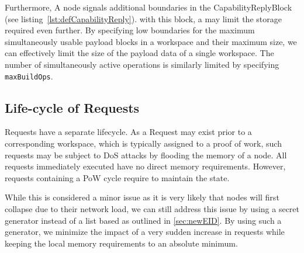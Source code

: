 Furthermore, A node signals additional boundaries in the CapabilityReplyBlock (see listing~\ref{lst:defCapabilityReply}). with this block, a \VortexNode{} may limit the storage required even further. By specifying low boundaries for the maximum simultaneously usable payload blocks in a workspace and their maximum size, we can effectively limit the size of the payload data of a single workspace. The number of simultaneously active operations is similarly limited by specifying \texttt{maxBuildOps}.

\subsection{Life-cycle of Requests}
Requests have a separate lifecycle. As a Request may exist prior to a corresponding workspace, which is typically assigned to a proof of work, such requests may be subject to DoS attacks by flooding the memory of a node. All requests immediately executed have no direct memory requirements. However, requests containing a PoW cycle require to maintain the state. 

While this is considered a minor issue as it is very likely that nodes will first collapse due to their network load, we can still address this issue by using a secret generator instead of a list based as outlined in \cref{sec:newEID}. By using such a generator, we minimize the impact of a very sudden increase in requests while keeping the local memory requirements to an absolute minimum. 


